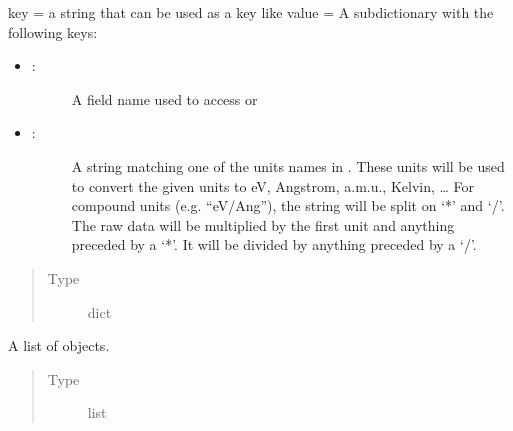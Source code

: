 \documentclass[letterpaper,10pt,english]{sphinxmanual}
\begin{document}
\begin{fulllineitems}
\begin{fulllineitems}
\label{\detokenize{property:colabfit.tools.property.Property.property_map}}
\sphinxAtStartPar
key = a string that can be used as a key like 
value = A sub\sphinxhyphen{}dictionary with the following keys:
\begin{itemize}
\item {} \begin{description}
\item[{:}] \leavevmode
\sphinxAtStartPar
A field name used to access  or 

\end{description}

\item {} \begin{description}
\item[{:}] \leavevmode
\sphinxAtStartPar
A string matching one of the units names in .
These units will be used to convert the given units to eV,
Angstrom, a.m.u., Kelvin, … For compound units (e.g. “eV/Ang”), the string will be split on
‘*’ and ‘/’. The raw data will be multiplied by the first unit
and anything preceded by a ‘*’. It will be divided by anything
preceded by a ‘/’.

\end{description}

\end{itemize}
\begin{quote}\begin{description}
\item[{Type}] \leavevmode
\sphinxAtStartPar
dict

\end{description}\end{quote}

\end{fulllineitems}


\begin{fulllineitems}
\label{\detokenize{property:colabfit.tools.property.Property.configurations}}
\sphinxAtStartPar
A list of {\hyperref[\detokenize{configuration:colabfit.tools.configuration.Configuration}]{}} objects.
\begin{quote}\begin{description}
\item[{Type}] \leavevmode
\sphinxAtStartPar
list


\end{description}
\end{quote}
\end{fulllineitems}
\end{fulllineitems}
\end{document}
